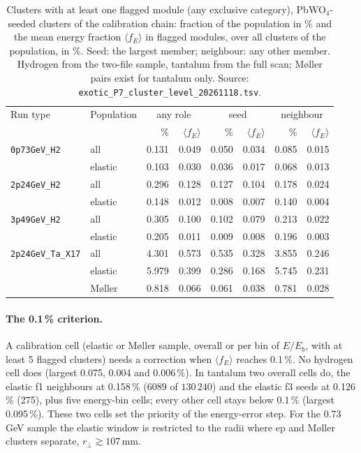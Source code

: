 \documentclass[11pt]{article}
\newcommand{\code}[1]{\texttt{#1}}
\begin{document}
\begin{table}[htbp]
\centering
\caption{Clusters with at least one flagged module (any exclusive category), PbWO$_4$-seeded clusters of the calibration chain: fraction of the population in \% and the mean energy fraction $\langle f_E \rangle$ in flagged modules, over all clusters of the population, in \%. Seed: the largest member; neighbour: any other member. Hydrogen from the two-file sample, tantalum from the full scan; M\o ller pairs exist for tantalum only. Source: \code{exotic\_P7\_cluster\_level\_20261118.tsv}.}
\label{tab:exotic_cluster}
\small
\begin{tabular}{llrrrrrr}
\toprule
Run type & Population & \multicolumn{2}{c}{any role} & \multicolumn{2}{c}{seed} & \multicolumn{2}{c}{neighbour} \\
 & & \% & $\langle f_E \rangle$ & \% & $\langle f_E \rangle$ & \% & $\langle f_E \rangle$ \\
\midrule
\code{0p73GeV\_H2} & all & 0.131 & 0.049 & 0.050 & 0.034 & 0.085 & 0.015 \\
 & elastic & 0.103 & 0.030 & 0.036 & 0.017 & 0.068 & 0.013 \\
\code{2p24GeV\_H2} & all & 0.296 & 0.128 & 0.127 & 0.104 & 0.178 & 0.024 \\
 & elastic & 0.148 & 0.012 & 0.008 & 0.007 & 0.140 & 0.004 \\
\code{3p49GeV\_H2} & all & 0.305 & 0.100 & 0.102 & 0.079 & 0.213 & 0.022 \\
 & elastic & 0.205 & 0.011 & 0.009 & 0.008 & 0.196 & 0.003 \\
\code{2p24GeV\_Ta\_X17} & all & 4.301 & 0.573 & 0.535 & 0.328 & 3.855 & 0.246 \\
 & elastic & 5.979 & 0.399 & 0.286 & 0.168 & 5.745 & 0.231 \\
 & M\o ller & 0.818 & 0.066 & 0.061 & 0.038 & 0.781 & 0.028 \\
\bottomrule
\end{tabular}
\end{table}

\paragraph{The 0.1\,\% criterion.} A calibration cell (elastic or M\o ller sample, overall or per bin of $E/E_b$, with at least 5 flagged clusters) needs a correction when $\langle f_E \rangle$ reaches 0.1\,\%. No hydrogen cell does (largest 0.075, 0.004 and 0.006\,\%). In tantalum two overall cells do, the elastic f1 neighbours at 0.158\,\% ($6089$ of $130\,240$) and the elastic f3 seeds at 0.126\,\% (275), plus five energy-bin cells; every other cell stays below 0.1\,\% (largest 0.095\,\%). These two cells set the priority of the energy-error step. For the 0.73\,GeV sample the elastic window is restricted to the radii where ep and M\o ller clusters separate, $r_\perp \gtrsim 107$\,mm.
\end{document}
